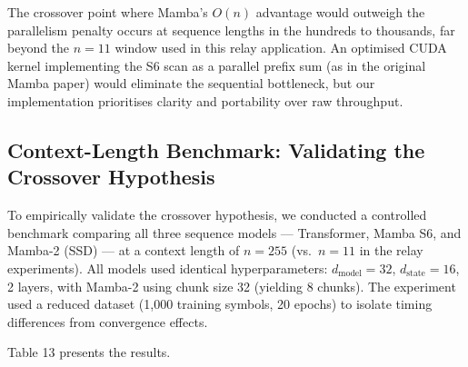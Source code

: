 The crossover point where Mamba's \(O(n)\) advantage would outweigh the parallelism penalty occurs at sequence lengths in the hundreds to thousands, far beyond the \(n = 11\) window used in this relay application. An optimised CUDA kernel implementing the S6 scan as a parallel prefix sum (as in the original Mamba paper) would eliminate the sequential bottleneck, but our implementation prioritises clarity and portability over raw throughput.

\subsection{Context-Length Benchmark: Validating the Crossover Hypothesis}\label{sec:context-length-benchmark-validating-the-crossover-hypothesis}

To empirically validate the crossover hypothesis, we conducted a controlled benchmark comparing all three sequence models --- Transformer, Mamba S6, and Mamba-2 (SSD) --- at a context length of \(n = 255\) (vs.~\(n = 11\) in the relay experiments). All models used identical hyperparameters: \(d_{\text{model}} = 32\), \(d_{\text{state}} = 16\), 2 layers, with Mamba-2 using chunk size 32 (yielding 8 chunks). The experiment used a reduced dataset (1,000 training symbols, 20 epochs) to isolate timing differences from convergence effects.

Table 13 presents the results.

